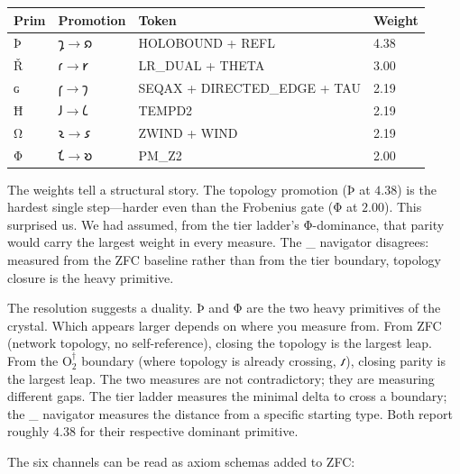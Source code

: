 \documentclass[12pt,twoside]{book}
\theoremstyle{definition}
\newcommand{\ZFCt}{\text{ZFC}_{\tau}}
\newcommand{\tier}[1]{\mathrm{O}_{#1}}
\begin{document}
\begin{center}
\begin{tabular}{llll}
\toprule
\textbf{Prim} & \textbf{Promotion} & \textbf{Token} & \textbf{Weight} \\
\midrule
Þ & $𐑡 \to 𐑸$ & HOLOBOUND + REFL           & 4.38 \\
Ř & $𐑩 \to 𐑾$ & LR\_DUAL + THETA            & 3.00 \\
ɢ & $𐑝 \to 𐑠$ & SEQAX + DIRECTED\_EDGE + TAU & 2.19 \\
Ħ & $𐑓 \to 𐑖$ & TEMPD2                       & 2.19 \\
Ω & $𐑷 \to 𐑭$ & ZWIND + WIND                 & 2.19 \\
Φ & $𐑗 \to 𐑹$ & PM\_Z2                       & 2.00 \\
\bottomrule
\end{tabular}
\end{center}

The weights tell a structural story. The topology promotion (Þ at $4.38$) is the hardest
single step---harder even than the Frobenius gate (Φ at $2.00$). This surprised us. We had
assumed, from the tier ladder's Φ-dominance, that parity would carry the largest weight in
every measure. The \ZFCt{} navigator disagrees: measured from the ZFC baseline rather than
from the tier boundary, topology closure is the heavy primitive.

The resolution suggests a duality. Þ and Φ are the two heavy primitives of the crystal.
Which appears larger depends on where you measure from. From ZFC (network topology, no
self-reference), closing the topology is the largest leap. From the $\tier{2}^{\dagger}$
boundary (where topology is already crossing, 𐑥), closing parity is the largest leap. The
two measures are not contradictory; they are measuring different gaps. The tier ladder
measures the minimal delta to cross a boundary; the \ZFCt{} navigator measures the
distance from a specific starting type. Both report roughly $4.38$ for their respective
dominant primitive.

The six channels can be read as axiom schemas added to ZFC:
\end{document}
